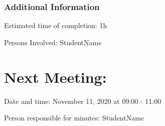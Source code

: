 \documentclass[11pt]{meetingmins} %
\begin{document}
    \subsubsection{Additional Information}
        \begin{hiddensubitems}
            \item
                Estimated time of completion: 1h
            \item
                Persons Involved: StudentName
        \end{hiddensubitems}
    
\section{Next Meeting:}
    \begin{hiddensubitems}
        \item
            Date and time: November 11, 2020 at 09:00 - 11:00
        \item
            Person responsible for minutes: StudentName
    \end{hiddensubitems}
\end{document}
